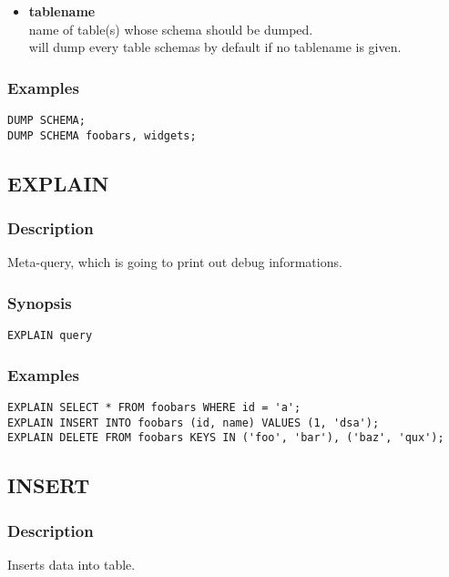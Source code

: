 \begin{itemize}
	\item \textbf{tablename}\\
	name of table(s) whose schema should be dumped.\\
	will dump every table schemas by default if no tablename is given.
\end{itemize}

\subsubsection{Examples}
\lstset{language=Java}
\begin{lstlisting}
DUMP SCHEMA;
DUMP SCHEMA foobars, widgets;	
\end{lstlisting}
\vspace{40pt}

\subsection{EXPLAIN}
\subsubsection{Description}
Meta-query, which is going to print out debug informations.
\subsubsection{Synopsis}
\lstset{language=Java}
\begin{lstlisting}
EXPLAIN query	
\end{lstlisting}
\vspace{20pt}

\subsubsection{Examples}
\lstset{language=Java}
\begin{lstlisting}
EXPLAIN SELECT * FROM foobars WHERE id = 'a';
EXPLAIN INSERT INTO foobars (id, name) VALUES (1, 'dsa');
EXPLAIN DELETE FROM foobars KEYS IN ('foo', 'bar'), ('baz', 'qux');	
\end{lstlisting}
\vspace{40pt}

\subsection{INSERT}
\subsubsection{Description}
Inserts data into table.

